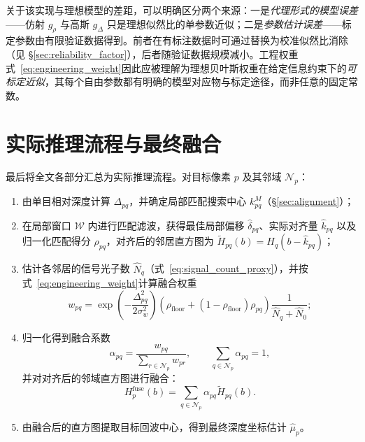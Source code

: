\documentclass[11pt,a4paper]{ctexart}
\numberwithin{equation}{section}
\begin{document}
关于该实现与理想模型的差距，可以明确区分两个来源：一是\emph{代理形式的模型误差}——仿射 $g_\rho$ 与高斯 $g_\Delta$ 只是理想似然比的单参数近似；二是\emph{参数估计误差}——标定参数由有限验证数据得到。前者在有标注数据时可通过替换为校准似然比消除（见 \S\ref{sec:reliability_factor}），后者随验证数据规模减小。工程权重式~\eqref{eq:engineering_weight}因此应被理解为理想贝叶斯权重在给定信息约束下的\emph{可标定近似}，其每个自由参数都有明确的模型对应物与标定途径，而非任意的固定常数。

\section{实际推理流程与最终融合}
\label{sec:inference_pipeline}

最后将全文各部分汇总为实际推理流程。对目标像素 $p$ 及其邻域 $\mathcal N_p$：

\begin{enumerate}
    \item 由单目相对深度计算 $\Delta_{pq}$，并确定局部匹配搜索中心 $k_{pq}^{M}$（\S\ref{sec:alignment}）；
    \item 在局部窗口 $\mathcal W$ 内进行匹配滤波，获得最佳局部偏移 $\hat\delta_{pq}$、实际对齐量 $\hat k_{pq}$ 以及归一化匹配得分 $\rho_{pq}$，对齐后的邻居直方图为 $\widetilde H_{pq}(b)=H_q(b-\hat k_{pq})$；
    \item 估计各邻居的信号光子数 $\hat N_q$（式~\eqref{eq:signal_count_proxy}），并按式~\eqref{eq:engineering_weight}计算融合权重
    \begin{equation}
    w_{pq}
    =
    \exp\!\left(
    -\frac{\Delta_{pq}^{2}}
    {2\sigma_w^{2}}
    \right)
    \left(\rho_{\mathrm{floor}}
    +
    (1-\rho_{\mathrm{floor}})\rho_{pq}\right)
    \frac{1}{\hat N_q+\hat N_0};
    \label{eq:runtime_weight}
    \end{equation}
    \item 归一化得到融合系数
    \begin{equation}
    \alpha_{pq}
    =
    \frac{w_{pq}}
    {\sum_{r\in\mathcal N_p}w_{pr}},
    \qquad
    \sum_{q\in\mathcal N_p}\alpha_{pq}=1,
    \label{eq:runtime_alpha}
    \end{equation}
    并对对齐后的邻域直方图进行融合：
    \begin{equation}
    \boxed{
    H_p^{\mathrm{fuse}}(b)
    =
    \sum_{q\in\mathcal N_p}
    \alpha_{pq}
    \widetilde H_{pq}(b)
    }.
    \label{eq:fused_histogram}
    \end{equation}
    \item 由融合后的直方图提取目标回波中心，得到最终深度坐标估计 $\hat\mu_p$。
\end{enumerate}
\end{document}
